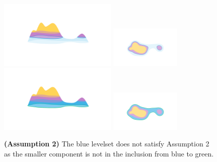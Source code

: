 \begin{figure}[htbp]\label{fig:assumption2}
  \centering
  \includegraphics[trim=200 300 200 200, clip, width=0.5\textwidth]{figures/surf-ass2_C_side.png}
  \includegraphics[trim=300 200 200 200, clip, width=0.3\textwidth]{figures/surf-ass2_C_top.png}
  \includegraphics[trim=200 300 200 200, clip, width=0.5\textwidth]{figures/surf-ass2_B_side.png}
  \includegraphics[trim=300 200 200 200, clip, width=0.3\textwidth]{figures/surf-ass2_B_top.png}
  \caption{\textbf{(Assumption 2)} The blue levelset does not satisfy Assumption 2 as the smaller component is not in the inclusion from blue to green.}
\end{figure}

